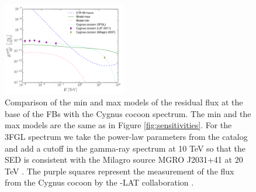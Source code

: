 \begin{figure}[h]
\centering
 \includegraphics[width=0.48\textwidth]{plots/low_lat_FB_CTA_cygnus.pdf}
 \caption{
 Comparison of the min and max models of the residual flux at the base of the FBs with the Cygnus cocoon spectrum. 
 The min and the max models are the same as in Figure \ref{fig:sensitivities}.
 For the 3FGL spectrum we take the power-law parameters from the catalog \citep{2015ApJS..218...23A}
 and add a cutoff in the gamma-ray spectrum at 10 TeV so that the SED is consistent with the Milagro source MGRO J2031+41 
 at 20 TeV \citep{2007ApJ...664L..91A}.
The purple squares represent the measurement of the flux from the Cygnus cocoon by the \Fermi-LAT collaboration
\citep{2011Sci...334.1103A}.
 }
 \label{fig:cygnus}
\end{figure}

